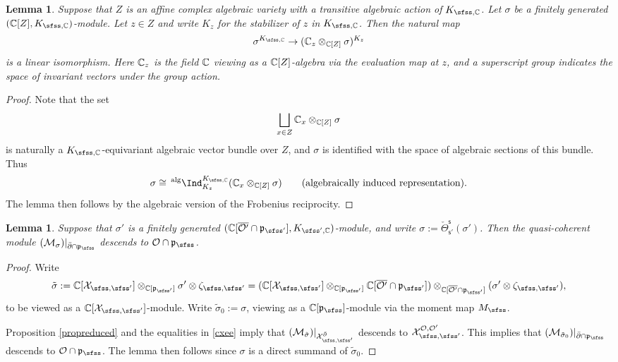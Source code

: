 \documentclass[12pt,a4paper]{amsart}
\newcommand{\CM}{{\mathcal {M}}}
\newcommand{\CO}{{\mathcal {O}}}
\newcommand{\CX}{{\mathcal {X}}}
\newcommand{\p}{\mathfrak p}
\numberwithin{equation}{section}
\newtheorem{lem}[thm]{Lemma}
\theoremstyle{remark}
\begin{document}
\begin{lem}\label{geotheta2}
Suppose that  $Z$ is an affine complex algebraic variety with a transitive algebraic action of $K_{\sfss, \C}$. Let $\sigma$ be a finitely generated $(\C[Z], K_{\sfss, \C})$-module.
Let $z\in Z$ and write $K_z$ for the stabilizer of $z$ in $K_{\sfss, \C}$. Then  the natural map
\[
  \sigma^{K_{\sfss, \C}}\rightarrow (\C_z\otimes_{\C[Z]} \sigma)^{K_{z}}
\]
is a linear isomorphism. Here $\mathbb{C}_z$ is the field $\mathbb{C}$ viewing as a $\mathbb{C}[Z]$-algebra via the evaluation map at $z$, and a superscript group indicates the space of  invariant vectors under the group action.
\end{lem}
\begin{proof}
Note that the set
\[
 \bigsqcup_{x\in Z} \mathbb{C}_x\otimes_{\mathbb{C}[Z]} \sigma
\]
is naturally a $K_{\sfss, \C}$-equivariant algebraic vector bundle over $Z$, and  $\sigma$ is identified with the space of algebraic sections of this bundle. Thus
\[
  \sigma\cong \,^{\mathrm{alg}}\Ind_{K_z}^{K_{\sfss, \C}}(\C_x\otimes_{\C[Z]}\sigma)\qquad(\textrm{algebraically induced representation}).
\]
The lemma then follows by the algebraic version of the Frobenius reciprocity.
\end{proof}


\begin{lem}\label{geotheta3}
Suppose that $\sigma'$ is a finitely generated  $(\C[\overline{\CO'}\cap \p_{\sfss'}], K_{\sfss', \C})$-module, and write $\sigma:=\check \Theta_{\mathsf s'}^{\mathsf s}(\sigma')$. Then the  quasi-coherent module $(\CM_\sigma)|_{\bar \partial \cap \p_\sfss}$ descends  to $\CO\cap \p_\sfss$.
\end{lem}
\begin{proof}
Write
\[
 \tilde \sigma:=\C[\CX_{\sfss, \sfss'}]\otimes_{\C[\p_{\sfss'}]} \sigma'\otimes \zeta_{\sfss, \sfss'}=(\C[\CX_{\sfss, \sfss'}]\otimes_{\C[\p_{\sfss'}]} {\C[\overline{\CO'}\cap \p_{\sfss'}]})\otimes_{\C[\overline{\CO'}\cap \p_{\sfss'}]}(\sigma'\otimes \zeta_{\sfss, \sfss'}),
\]
to be viewed as a $\C[\CX_{\sfss, \sfss'}]$-module. Write $\tilde \sigma_0:=\sigma$, viewing as a $\C[\p_\sfss]$-module via the moment map $M_\sfss$.

Proposition \ref{propreduced} and the equalities  in \eqref{cxee} imply that
$(\CM_{ \tilde \sigma})|_{\CX_{\sfss, \sfss'}^{\bar \partial}}$ descends to $ \CX_{\sfss, \sfss'}^{\CO, \CO'}$. This implies that $(\CM_{ \tilde \sigma_0})|_{\bar \partial\cap \p_\sfss}$ descends to $ \CO\cap \p_\sfss$. The lemma then follows since $\sigma$ is a direct summand of $\tilde \sigma_0$.
\end{proof}
\end{document}
